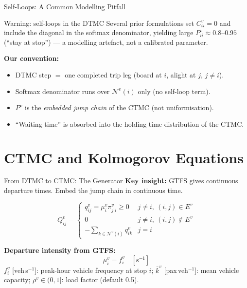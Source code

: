 \documentclass[aspectratio=169,12pt]{beamer}
\begin{document}
\begin{frame}{Self-Loops: A Common Modelling Pitfall}
\begin{alertblock}{Warning: self-loops in the DTMC}
Several prior formulations set $C^v_{ii}=0$ and include the diagonal in the softmax
denominator, yielding large $P^v_{ii}\approx0.8$--$0.95$ (``stay at stop'')
— a modelling artefact, not a calibrated parameter.
\end{alertblock}

\vspace{6pt}
\textbf{Our convention:}
\begin{itemize}
  \item DTMC step $=$ one completed trip leg (board at $i$, alight at $j$, $j\ne i$).
  \item Softmax denominator runs over $\mathcal{N}^v(i)$ only (no self-loop term).
  \item $P^v$ is the \emph{embedded jump chain} of the CTMC (not uniformisation).
  \item ``Waiting time'' is absorbed into the holding-time distribution of the CTMC.
\end{itemize}
\end{frame}

\section{CTMC and Kolmogorov Equations}
\begin{frame}{From DTMC to CTMC: The Generator}
\textbf{Key insight:} GTFS gives continuous departure times.
Embed the jump chain in continuous time.

\begin{definition}
\[
Q^v_{ij} = \begin{cases}
  q^v_{ij} = \mu^v_i\pi^v_{j|i} \ge 0 & j\ne i,\ (i,j)\in E^v \\
  0 & j\ne i,\ (i,j)\notin E^v \\
  -\sum_{k\in\mathcal{N}^v(i)} q^v_{ik} & j=i
\end{cases}
\]
\end{definition}

\textbf{Departure intensity from GTFS:}
\[
\mu^v_i = f^v_i \quad [\text{s}^{-1}]
\]
$f^v_i$ [veh\,s$^{-1}$]: peak-hour vehicle frequency at stop $i$;
$\bar k^v$ [pax\,veh$^{-1}$]: mean vehicle capacity;
$\rho^v\in(0,1]$: load factor (default 0.5).
\end{frame}
\end{document}

